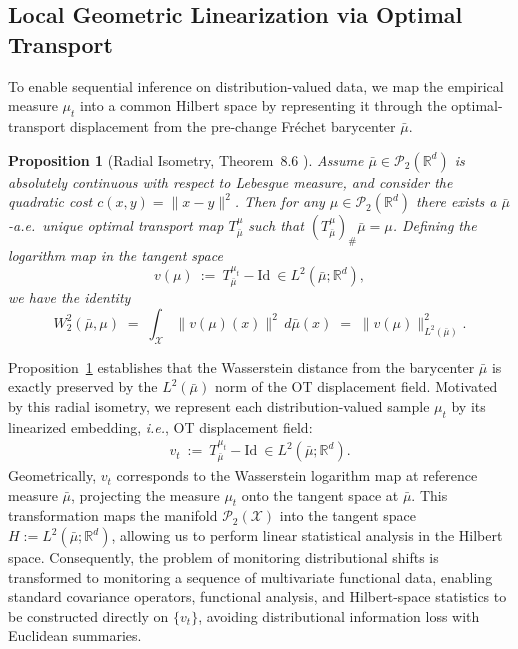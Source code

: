 \documentclass{article}
\newcommand{\ie}{\textit{i.e.}, \xspace}
\theoremstyle{plain}
\newtheorem{proposition}[theorem]{Proposition}
\theoremstyle{definition}
\theoremstyle{remark}
\begin{document}
\subsection{Local Geometric Linearization via Optimal Transport}\label{sec:geom_lin}
To enable sequential inference  on distribution-valued data, we map the empirical measure $\mu_t$ into a common Hilbert space by representing it through the optimal-transport displacement from the pre-change Fr\'echet barycenter $\bar{\mu}$.

\begin{proposition}[Radial Isometry, Theorem~8.6 \cite{Villani2009OT}]\label{prop:radial_isometry}
Assume $\bar{\mu}\in\mathcal{P}_2(\mathbb{R}^d)$ is absolutely continuous with respect to Lebesgue measure, and consider the quadratic cost $c(x,y)=\|x-y\|^2$.
Then for any $\mu\in\mathcal{P}_2(\mathbb{R}^d)$ there exists a $\bar{\mu}$-a.e.\ unique optimal transport map
$T_{\bar{\mu}}^{\mu}$ such that $(T_{\bar{\mu}}^{\mu})_{\#}\bar{\mu}=\mu$.
Defining the logarithm map in the tangent space
\[
v(\mu)\ :=\ T_{\bar{\mu}}^{\mu_t}-\mathrm{Id}\ \in L^2(\bar{\mu};\mathbb{R}^d),
\]
we have the identity
\begin{equation}
\label{eq:radial_isometry}
W_2^2(\bar{\mu},\mu)
\;=\;
\int_{\mathcal{X}} \|v(\mu)(x)\|^2\,d\bar{\mu}(x)
\;=\;
\|v(\mu)\|_{L^2(\bar{\mu})}^2 .
\end{equation}
\end{proposition}

Proposition~\ref{prop:radial_isometry} establishes that the Wasserstein distance from the barycenter $\bar{\mu}$ is exactly preserved by the $L^2(\bar{\mu})$ norm of the OT displacement field.
Motivated by this radial isometry, we represent each distribution-valued sample $\mu_t$ by its linearized embedding, \ie OT displacement field:
\begin{align}
    v_t\ :=\ T_{\bar\mu}^{\mu_t}-\mathrm{Id}\ \in L^2(\bar\mu;\mathbb R^d).
\end{align}
Geometrically, $v_t$ corresponds to the Wasserstein logarithm map at reference measure $\bar{\mu}$, projecting the measure $\mu_t$ onto the tangent space at $\bar{\mu}$.
This transformation maps the manifold $\mathcal{P}_2(\mathcal{X})$ into the tangent space $H:=L^2(\bar\mu;\mathbb R^d)$, allowing us to perform linear statistical analysis in the Hilbert space.
Consequently, the problem of monitoring distributional shifts is transformed to monitoring a sequence of multivariate functional data, enabling standard covariance operators, functional analysis, and Hilbert-space statistics to be constructed directly on
$\{v_t\}$, avoiding distributional information loss with Euclidean summaries.
\end{document}
